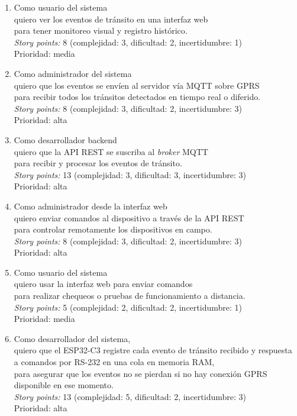 \documentclass[
11pt, %
]{charter}
\begin{document}
\begin{enumerate}

\item
Como usuario del sistema\\
quiero ver los eventos de tránsito en una interfaz web\\
para tener monitoreo visual y registro histórico.\\
\textit{Story points:} 8 (complejidad: 3, dificultad: 2, incertidumbre: 1)\\
Prioridad: media

\item 
Como administrador del sistema\\
quiero que los eventos se envíen al servidor vía MQTT sobre GPRS\\
para recibir todos los tránsitos detectados en tiempo real o diferido.\\
\textit{Story points:} 8 (complejidad: 3, dificultad: 2, incertidumbre: 3)\\
Prioridad: alta

\item
Como desarrollador backend\\
quiero que la API REST se suscriba al \textit{broker} MQTT\\
para recibir y procesar los eventos de tránsito.\\
\textit{Story points:} 13 (complejidad: 3, dificultad: 3, incertidumbre: 3)\\
Prioridad: alta

\item 
Como administrador desde la interfaz web\\
quiero enviar comandos al dispositivo a través de la API REST\\
para controlar remotamente los dispositivos en campo.\\
\textit{Story points:} 8 (complejidad: 3, dificultad: 2, incertidumbre: 3)\\
Prioridad: alta

\item 
Como usuario del sistema\\
quiero usar la interfaz web para enviar comandos\\
para realizar chequeos o pruebas de funcionamiento a distancia.\\
\textit{Story points:} 5 (complejidad: 2, dificultad: 2, incertidumbre: 1)\\
Prioridad: media

\item 
Como desarrollador del sistema,\\
quiero que el ESP32-C3 registre cada evento de tránsito recibido y respuesta a comandos por RS-232 en una cola en memoria RAM,\\
para asegurar que los eventos no se pierdan si no hay conexión GPRS disponible en ese momento.\\
\textit{Story points:} 13 (complejidad: 5, dificultad: 2, incertidumbre: 3)\\
Prioridad: alta


\end{enumerate}
\end{document}
